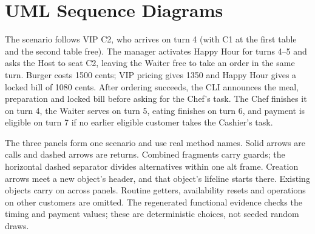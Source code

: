 \section{UML Sequence Diagrams}
\label{sec:sequence}
The scenario follows VIP C2, who arrives on turn 4 (with C1 at the first table and the second table free). The manager activates Happy
Hour for turns 4--5 and asks the Host to seat C2, leaving the Waiter free to take
an order in the same turn. Burger costs 1500 cents; VIP pricing gives 1350 and
Happy Hour gives a locked bill of 1080 cents. After ordering succeeds, the CLI announces the meal, preparation and locked bill before asking for the Chef's task. The Chef finishes it on turn 4,
the Waiter serves on turn 5, eating finishes on turn 6, and payment is eligible
on turn 7 if no earlier eligible customer takes the Cashier's task.

The three panels form one scenario and use real method names. Solid arrows are
calls and dashed arrows are returns. Combined fragments carry guards; the
horizontal dashed separator divides alternatives within one \textsf{alt} frame.
Creation arrows meet a new object's header, and that object's lifeline starts
there. Existing objects carry on across panels. Routine getters, availability
resets and operations on other customers are omitted. The regenerated functional
evidence checks the timing and payment values; these are deterministic choices,
not seeded random draws.

